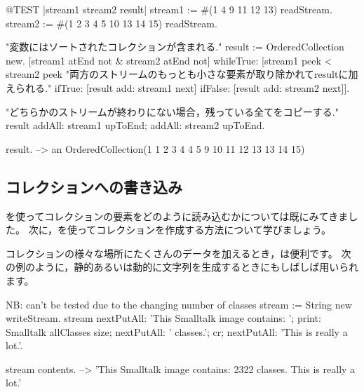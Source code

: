 \documentclass[a4paper,10pt,twoside]{book}
\begin{document}
\begin{code}{@TEST |stream1 stream2 result|}
stream1 := #(1 4 9 11 12 13) readStream.
stream2 := #(1 2 3 4 5 10 13 14 15) readStream.

"変数にはソートされたコレクションが含まれる."
result := OrderedCollection new.
[stream1 atEnd not & stream2 atEnd not]
  whileTrue: [stream1 peek < stream2 peek
    "両方のストリームのもっとも小さな要素が取り除かれてresultに加えられる."
    ifTrue: [result add: stream1 next]
    ifFalse: [result add: stream2 next]].

"どちらかのストリームが終わりにない場合，残っている全てをコピーする."
result
  addAll: stream1 upToEnd;
  addAll: stream2 upToEnd.

result. -->   an OrderedCollection(1 1 2 3 4 4 5 9 10 11 12 13 13 14 15)
\end{code}

\subsection{コレクションへの書き込み}

を使ってコレクションの要素をどのように読み込むかについては既にみてきました。
次に，を使ってコレクションを作成する方法について学びましょう。

コレクションの様々な場所にたくさんのデータを加えるとき，は便利です。
次の例のように，静的あるいは動的に文字列を生成するときにもしばしば用いられます。


\begin{code}{NB: can't be tested due to the changing number of classes}
stream := String new writeStream.
stream
  nextPutAll: 'This Smalltalk image contains: ';
  print: Smalltalk allClasses size;
  nextPutAll: ' classes.';
  cr;
  nextPutAll: 'This is really a lot.'.

stream contents. --> 'This Smalltalk image contains: 2322 classes.
This is really a lot.'
\end{code}
\end{document}
